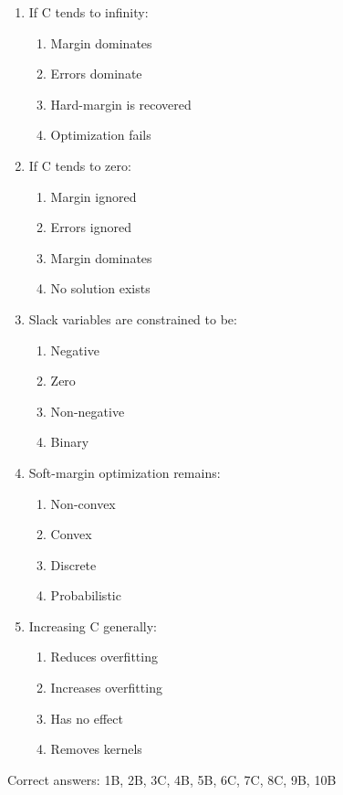 \documentclass{article}
\begin{document}
\begin{enumerate}
		\item If C tends to infinity:
		\begin{enumerate}
			\item Margin dominates
			\item Errors dominate
			\item Hard-margin is recovered
			\item Optimization fails
		\end{enumerate}
		
		\item If C tends to zero:
		\begin{enumerate}
			\item Margin ignored
			\item Errors ignored
			\item Margin dominates
			\item No solution exists
		\end{enumerate}
		
		\item Slack variables are constrained to be:
		\begin{enumerate}
			\item Negative
			\item Zero
			\item Non-negative
			\item Binary
		\end{enumerate}
		
		\item Soft-margin optimization remains:
		\begin{enumerate}
			\item Non-convex
			\item Convex
			\item Discrete
			\item Probabilistic
		\end{enumerate}
		
		\item Increasing C generally:
		\begin{enumerate}
			\item Reduces overfitting
			\item Increases overfitting
			\item Has no effect
			\item Removes kernels
		\end{enumerate}
	\end{enumerate}
	
	Correct answers: 1B, 2B, 3C, 4B, 5B, 6C, 7C, 8C, 9B, 10B
	
\end{document}
